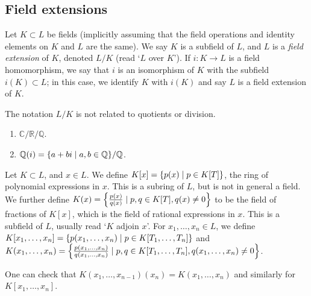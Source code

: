 \subsection{Field extensions}
\begin{definition}
	Let \( K \subset L \) be fields (implicitly assuming that the field operations and identity elements on \( K \) and \( L \) are the same).
	We say \( K \) is a subfield of \( L \), and \( L \) is a \emph{field extension} of \( K \), denoted \( L / K \) (read `\( L \) over \( K \)').
	If \( i \colon K \to L \) is a field homomorphism, we say that \( i \) is an isomorphism of \( K \) with the subfield \( i(K) \subset L \); in this case, we identify \( K \) with \( i(K) \) and say \( L \) is a field extension of \( K \).
\end{definition}
\begin{remark}
	The notation \( L / K \) is not related to quotients or division.
\end{remark}
\begin{example}
	\begin{enumerate}
		\item \( \mathbb C / \mathbb R / \mathbb Q \).
		\item \( \mathbb Q(i) = \qty{a + bi \mid a,b \in \mathbb Q} / \mathbb Q \).
	\end{enumerate}
\end{example}
\begin{definition}
	Let \( K \subset L \), and \( x \in L \).
	We define \( K[x] = \qty{p(x) \mid p \in K[T]} \), the ring of polynomial expressions in \( x \).
	This is a subring of \( L \), but is not in general a field.
	We further define \( K(x) = \qty{\frac{p(x)}{q(x)} \mid p,q \in K[T], q(x) \neq 0} \) to be the field of fractions of \( K[x] \), which is the field of rational expressions in \( x \).
	This is a subfield of \( L \), usually read `\( K \) adjoin \( x \)'.
	For \( x_1, \dots, x_n \in L \), we define \( K[x_1, \dots, x_n] = \qty{p(x_1, \dots, x_n) \mid p \in K[T_1, \dots, T_n]} \) and \( K(x_1, \dots, x_n) = \qty{\frac{p(x_1, \dots, x_n)}{q(x_1, \dots, x_n)} \mid p,q \in K[T_1, \dots, T_n], q(x_1, \dots, x_n) \neq 0} \).
\end{definition}
\begin{remark}
	One can check that \( K(x_1, \dots, x_{n-1})(x_n) = K(x_1, \dots, x_n) \) and similarly for \( K[x_1, \dots, x_n] \).
\end{remark}

